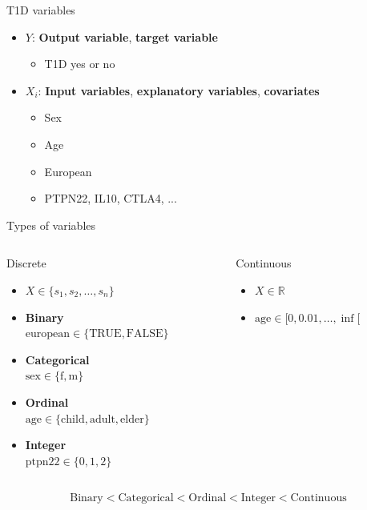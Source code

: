 \documentclass{beamer}\usepackage[]{graphicx}\usepackage[]{color}
\begin{document}
\begin{frame}{T1D variables}
  \begin{itemize}
    \item $Y$: \textbf{Output variable}, \textbf{target variable}
      \begin{itemize}
        \item T1D yes or no
      \end{itemize}
    \item $X_i$: \textbf{Input variables}, \textbf{explanatory variables}, 
      \textbf{covariates}
      \begin{itemize}
        \item Sex
        \item Age
        \item European
        \item PTPN22, IL10, CTLA4, ...
      \end{itemize}
  \end{itemize}
\end{frame}

\begin{frame}{Types of variables}
  \begin{columns}[t]
    \begin{column}{.45\linewidth}
      \begin{exampleblock}{Discrete}
        \begin{itemize}
          \item $X \in \{s_1, s_2, \dots, s_n\}$
          \item {\bf Binary} 
            \\ $\text{european} \in \{\text{TRUE}, \text{FALSE}\}$
          \item {\bf Categorical} \\ 
            $\text{sex} \in \{\text{f}, \text{m}\}$
          \item {\bf Ordinal} 
            \\ $\text{age} \in \{\text{child}, \text{adult}, \text{elder}\}$
          \item {\bf Integer} 
            \\ $\text{ptpn22} \in \{0, 1, 2\}$
        \end{itemize}
      \end{exampleblock}
    \end{column}
    \begin{column}{.45\linewidth}
      \begin{exampleblock}{Continuous}
        \begin{itemize}
          \item $X \in \mathbb{R}$
          \item $\text{age} \in [0, 0.01, \dots, \inf[$
        \end{itemize}
      \end{exampleblock}
    \end{column}
  \end{columns}
  \begin{align*}
    \text{Binary} < \text{Categorical} < \text{Ordinal} < \text{Integer} <
    \text{Continuous}
  \end{align*}
\end{frame}
\end{document}
